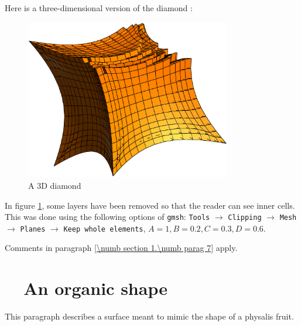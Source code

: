 Here is a three-dimensional version of the diamond :

\begin{figure}[ht] \centering
  \includegraphics[width=90mm]{cube-star}
  \caption{A 3D diamond}
  \label{\numb section 2.\numb fig 12}
\end{figure}

In figure \ref{\numb section 2.\numb fig 12}, some layers have been removed so that the reader
can see inner cells.
This was done using the following options of {\small\tt gmsh}: {\small\tt Tools} $\to$
{\small\tt Clipping} $\to$ {\small\tt Mesh} $\to$ {\small\tt Planes} $\to$
{\small\tt Keep whole elements}, $ A = 1, B = 0.2, C = 0.3, D = 0.6 $.

Comments in paragraph \ref{\numb section 1.\numb parag 7} apply.


\section{~~An organic shape}\label{\numb section 2.\numb parag 13}

This paragraph describes a surface meant to mimic the shape of a physalis fruit.


